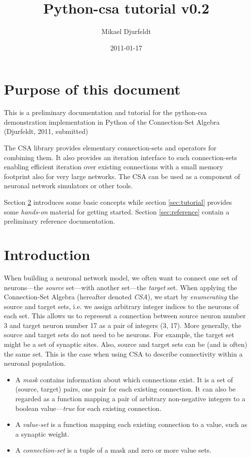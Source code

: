 \documentclass[a4paper,twoside]{report}
\title{Python-csa tutorial v0.2}
\author{Mikael Djurfeldt}
\date{2011-01-17}
\begin{document}
\maketitle

\tableofcontents

\chapter{Purpose of this document}
This is a preliminary documentation and tutorial for the python-csa
demonstration implementation in Python of the Connection-Set Algebra
(Djurfeldt, 2011, submitted)

The CSA library provides elementary connection-sets and operators for
combining them. It also provides an iteration interface to such
connection-sets enabling efficient iteration over existing connections
with a small memory footprint also for very large networks. The CSA
can be used as a component of neuronal network simulators or other
tools.

Section \ref{sec:introduction} introduces some basic concepts while
section \ref{sec:tutorial} provides some \emph{hands-on} material for
getting started.  Section \ref{sec:reference} contain a preliminary
reference documentation.

\chapter{Introduction}\label{sec:introduction}
When building a neuronal network model, we often want to connect one
set of neurons---the \emph{source} set---with another set---the
\emph{target} set.  When applying the Connection-Set Algebra
(hereafter denoted \emph{CSA}), we start by \emph{enumerating} the
source and target sets, i.e. we assign arbitrary integer indices to
the neurons of each set.  This allows us to represent a connection
between source neuron number 3 and target neuron number 17 as a pair
of integers (3, 17).  More generally, the source and target sets do
not need to be neurons.  For example, the target set might be a set of
synaptic sites.  Also, source and target sets can be (and is often)
the same set.  This is the case when using CSA to describe
connectivity within a neuronal population.

\begin{itemize}
\item A \emph{mask} contains information about which connections exist.  It
is a set of (source, target) pairs, one pair for each existing
connection.  It can also be regarded as a function mapping a pair of
arbitrary non-negative integers to a boolean value---\emph{true} for
each existing connection.
\item A \emph{value-set} is a function mapping each existing
connection to a value, such as a synaptic weight.
\item A \emph{connection-set} is a tuple of a mask and zero or more
  value sets.
\end{itemize}
\end{document}
